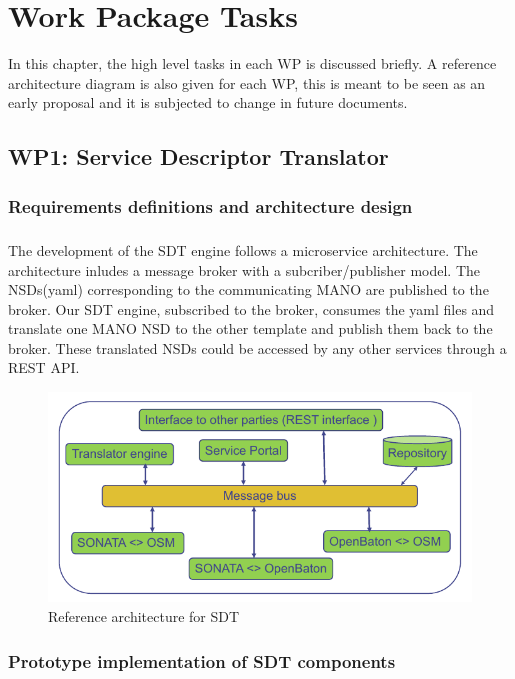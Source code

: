 \chapter{Work Package Tasks}
\label{ch:wptasks}

In this chapter, the high level tasks in each WP is discussed briefly. A reference architecture diagram is also given for each WP, this is meant to be seen as an early proposal and it is subjected to change in future documents.

\section{WP1: Service Descriptor Translator}

\subsection{Requirements definitions and architecture design}
\paragraph{}
The development of the SDT engine follows a microservice architecture. The architecture inludes a message broker with a subcriber/publisher model. The NSDs(yaml) corresponding to the communicating MANO are published to the broker. Our SDT engine, subscribed to the broker, consumes the yaml files and translate one MANO NSD to the other template and publish them back to the broker. These translated NSDs could be accessed by any other services through a REST API.
\begin{figure}[h]
	\centering
	\includegraphics[width=0.9\linewidth]{figures/wp1Arch}
	\caption{Reference architecture for SDT \cite{WPDescriptionsPDF}}
	\label{fig:wp1arch}
\end{figure}

\subsection{Prototype implementation of SDT components}
